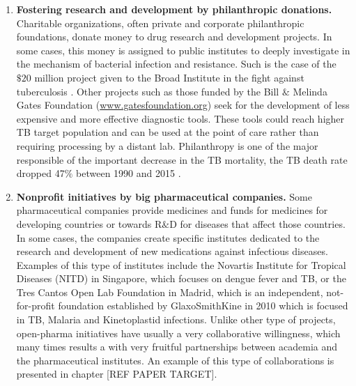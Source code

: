 \documentclass[12pt, b5paper,twoside]{tesi_upf}
\begin{document}
\begin{enumerate}

\item \textbf{Fostering research and development by philanthropic donations.} Charitable organizations, often private and corporate philanthropic foundations, donate money to drug research and development projects. In some cases, this money is assigned to public institutes to deeply investigate in the mechanism of bacterial infection and resistance. Such is the case of the $\$20$ million  project given to the Broad Institute in the fight against tuberculosis \cite{BroadInstitute}. Other projects such as those funded by the Bill $\&$ Melinda Gates Foundation (\url{www.gatesfoundation.org}) seek for the development of less expensive and more effective diagnostic tools. These tools could reach higher TB target population and can be used at the point of care rather than requiring processing by a distant lab. Philanthropy is one of the major responsible of the important decrease in the TB mortality, the TB death rate dropped 47$\%$ between 1990 and 2015 \cite{Lewandowski2015}. 

\item \textbf{Nonprofit initiatives by big pharmaceutical companies.} Some pharmaceutical companies provide medicines and funds for medicines for developing countries or towards R$\&$D for diseases that affect those countries. In some cases, the companies create specific institutes dedicated to the research and development of new medications against infectious diseases. Examples of this type of institutes include the Novartis Institute for Tropical Diseases (NITD) in Singapore, which focuses on dengue fever and TB, or the Tres Cantos Open Lab Foundation in Madrid, which is an independent, not-for-profit foundation established by GlaxoSmithKine in 2010 which is focused in TB, Malaria and Kinetoplastid infections. Unlike other type of projects, open-pharma initiatives have usually a very collaborative willingness, which many times results a with very fruitful partnerships between academia and the pharmaceutical institutes. An example of this type of collaborations is presented in chapter [REF PAPER TARGET].


\end{enumerate}
\end{document}

